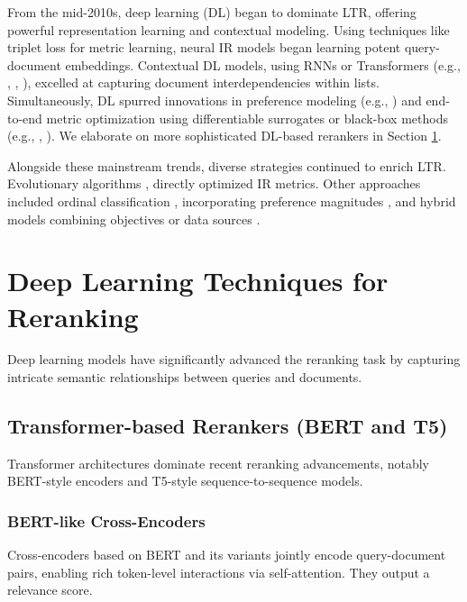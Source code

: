 \documentclass[runningheads]{llncs}
\begin{document}
From the mid-2010s, deep learning (DL) began to dominate LTR, offering powerful representation learning and contextual modeling. Using techniques like \cite{Schroff_2015} triplet loss for metric learning, neural IR models began learning potent query-document embeddings. Contextual DL models, using RNNs or Transformers (e.g., \cite{10.1145/3209978.3209985}, \cite{10.1145/3397271.3401104}, \cite{pei2019personalizedrerankingrecommendation}), excelled at capturing document interdependencies within lists. Simultaneously, DL spurred innovations in preference modeling (e.g., \cite{köppel2019pairwiselearningrankneural}) and end-to-end metric optimization using differentiable surrogates or black-box methods (e.g., \cite{8953684}, \cite{swezey2021pirankscalablelearningrank}). We elaborate on more sophisticated DL-based rerankers in Section \ref{dl-rerankers}.

Alongside these mainstream trends, diverse strategies continued to enrich LTR. Evolutionary algorithms \cite{paper25_ltr}, \cite{10.1145/3019612.3019696} directly optimized IR metrics. Other approaches included ordinal classification \cite{li2008learning}, incorporating preference magnitudes \cite{10.1145/1645953.1646057}, and hybrid models combining objectives or data sources \cite{10.1145/1835804.1835928}.

\section{Deep Learning Techniques for Reranking} \label{dl-rerankers}
Deep learning models have significantly advanced the reranking task by capturing intricate semantic relationships between queries and documents.

\subsection{Transformer-based Rerankers (BERT and T5)}
Transformer architectures dominate recent reranking advancements, notably BERT-style encoders and T5-style sequence-to-sequence models.
\subsubsection{BERT-like Cross-Encoders}
Cross-encoders based on BERT\cite{devlin2019bertpretrainingdeepbidirectional} and its variants jointly encode query-document pairs, enabling rich token-level interactions via self-attention\cite{vaswani2023attentionneed}. They output a relevance score.
\end{document}
